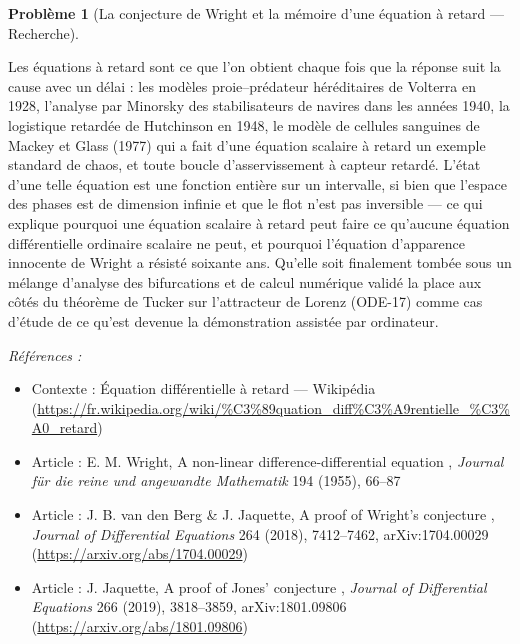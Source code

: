 \documentclass[11pt]{article}
\newtheorem{problem}{Problème}
\newenvironment{refs}{\par\small\noindent\emph{Références :}\begin{itemize}\setlength\itemsep{0pt}}{\end{itemize}\normalsize}
\begin{document}
\begin{problem}[{La conjecture de Wright et la mémoire d'une équation à retard --- Recherche}]
\end{problem}

\noindent Les équations à retard sont ce que l'on obtient chaque fois que la réponse
suit la cause avec un délai : les modèles proie--prédateur héréditaires de Volterra en 1928,
l'analyse par Minorsky des stabilisateurs de navires dans les années 1940, la logistique retardée
de Hutchinson en 1948, le modèle de cellules sanguines de Mackey et Glass (1977) qui a fait d'une
équation scalaire à retard un exemple standard de chaos, et toute boucle d'asservissement à
capteur retardé. L'état d'une telle équation est une fonction entière sur un intervalle, si bien
que l'espace des phases est de dimension infinie et que le flot n'est pas inversible --- ce qui
explique pourquoi une équation scalaire à retard peut faire ce qu'aucune équation différentielle
ordinaire scalaire ne peut, et pourquoi l'équation d'apparence innocente de Wright a résisté
soixante ans. Qu'elle soit finalement tombée sous un mélange d'analyse des bifurcations et de
calcul numérique validé la place aux côtés du théorème de Tucker sur l'attracteur de Lorenz
(ODE-17) comme cas d'étude de ce qu'est devenue la démonstration assistée par ordinateur.

\begin{refs}
\item Contexte : Équation différentielle à retard --- Wikipédia (\url{https://fr.wikipedia.org/wiki/%C3%89quation_diff%C3%A9rentielle_%C3%A0_retard})
\item Article : E. M. Wright, \og{} A non-linear difference-differential equation \fg{}, \textit{Journal für die reine und angewandte Mathematik} 194 (1955), 66--87
\item Article : J. B. van den Berg \& J. Jaquette, \og{} A proof of Wright's conjecture \fg{}, \textit{Journal of Differential Equations} 264 (2018), 7412--7462, arXiv:1704.00029 (\url{https://arxiv.org/abs/1704.00029})
\item Article : J. Jaquette, \og{} A proof of Jones' conjecture \fg{}, \textit{Journal of Differential Equations} 266 (2019), 3818--3859, arXiv:1801.09806 (\url{https://arxiv.org/abs/1801.09806})
\end{refs}

\bigskip
\end{document}
